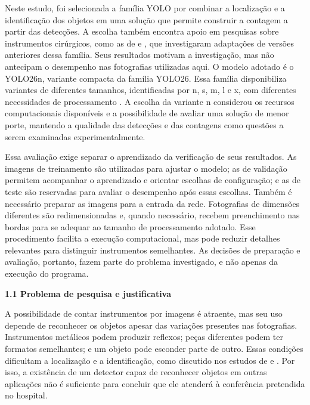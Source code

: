 Neste estudo, foi selecionada a família YOLO por combinar a localização e a identificação dos objetos em uma solução que permite construir a contagem a partir das detecções. A escolha também encontra apoio em pesquisas sobre instrumentos cirúrgicos, como as de \textcite{ran2023} e \textcite{jiang2023}, que investigaram adaptações de versões anteriores dessa família. Seus resultados motivam a investigação, mas não antecipam o desempenho nas fotografias utilizadas aqui. O modelo adotado é o YOLO26n, variante compacta da família YOLO26. Essa família disponibiliza variantes de diferentes tamanhos, identificadas por n, s, m, l e x, com diferentes necessidades de processamento \parencite{ultralyticsYOLO26intro}. A escolha da variante n considerou os recursos computacionais disponíveis e a possibilidade de avaliar uma solução de menor porte, mantendo a qualidade das detecções e das contagens como questões a serem examinadas experimentalmente.

Essa avaliação exige separar o aprendizado da verificação de seus resultados. As imagens de treinamento são utilizadas para ajustar o modelo; as de validação permitem acompanhar o aprendizado e orientar escolhas de configuração; e as de teste são reservadas para avaliar o desempenho após essas escolhas. Também é necessário preparar as imagens para a entrada da rede. Fotografias de dimensões diferentes são redimensionadas e, quando necessário, recebem preenchimento nas bordas para se adequar ao tamanho de processamento adotado. Esse procedimento facilita a execução computacional, mas pode reduzir detalhes relevantes para distinguir instrumentos semelhantes. As decisões de preparação e avaliação, portanto, fazem parte do problema investigado, e não apenas da execução do programa.

\vspace{\baselineskip}
{}
\noindent\textbf{1.1 Problema de pesquisa e justificativa}\par
\vspace{\baselineskip}

A possibilidade de contar instrumentos por imagens é atraente, mas seu uso depende de reconhecer os objetos apesar das variações presentes nas fotografias. Instrumentos metálicos podem produzir reflexos; peças diferentes podem ter formatos semelhantes; e um objeto pode esconder parte de outro. Essas condições dificultam a localização e a identificação, como discutido nos estudos de \textcite{ran2023} e \textcite{jiang2023}. Por isso, a existência de um detector capaz de reconhecer objetos em outras aplicações não é suficiente para concluir que ele atenderá à conferência pretendida no hospital.

